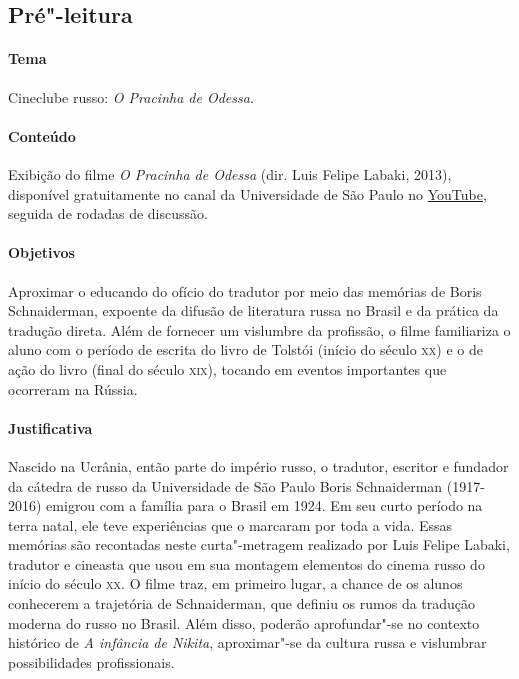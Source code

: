 \documentclass[11pt]{extarticle}
\begin{document}
\subsection{Pré"-leitura}

\paragraph{Tema} Cineclube russo: \emph{O Pracinha de Odessa}.


\paragraph{Conteúdo}
Exibição do filme \emph{O Pracinha de Odessa} (dir. Luis Felipe Labaki,
2013), disponível gratuitamente no canal da Universidade de São Paulo no
\href{https://www.youtube.com/watch?v=cXGSb7dsWo8}{YouTube}, seguida de rodadas de discussão.

\paragraph{Objetivos}
Aproximar o educando do ofício do tradutor por meio das memórias de
Boris Schnaiderman, expoente da difusão de literatura russa no Brasil e
da prática da tradução direta. Além de fornecer um vislumbre da
profissão, o filme familiariza o aluno com o período de escrita do livro
de Tolstói (início do século \textsc{xx}) e o de ação do livro (final do século
\textsc{xix}), tocando em eventos importantes que ocorreram na Rússia.

\paragraph{Justificativa}
Nascido na Ucrânia, então parte do império russo, o tradutor, escritor e
fundador da cátedra de russo da Universidade de São Paulo Boris
Schnaiderman (1917-2016) emigrou com a família para o Brasil em 1924. Em
seu curto período na terra natal, ele teve experiências que o marcaram
por toda a vida. Essas memórias são recontadas neste curta"-metragem
realizado por Luis Felipe Labaki, tradutor e cineasta que usou em sua
montagem elementos do cinema russo do início do século \textsc{xx}. O filme traz,
em primeiro lugar, a chance de os alunos conhecerem a trajetória de
Schnaiderman, que definiu os rumos da tradução moderna do russo no
Brasil. Além disso, poderão aprofundar"-se no contexto histórico de
\emph{A infância de Nikita}, aproximar"-se da cultura russa e vislumbrar
possibilidades profissionais.
\end{document}

